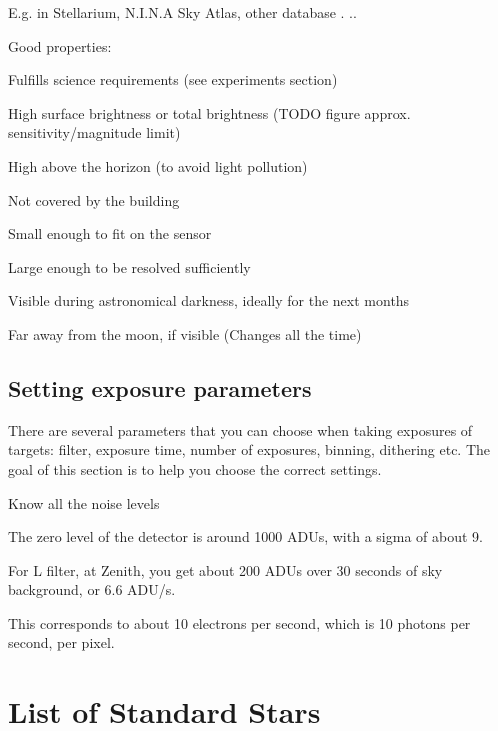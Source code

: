 \documentclass[a4paper, 11pt, fleqn]{memoir}
\begin{document}
E.g. in Stellarium, N.I.N.A Sky Atlas, other database .
..

Good properties:

Fulfills science requirements (see experiments section)

High surface brightness or total brightness (TODO figure approx.
sensitivity/magnitude limit)

High above the horizon (to avoid light pollution)

Not covered by the building

Small enough to fit on the sensor

Large enough to be resolved sufficiently

Visible during astronomical darkness, ideally for the next months

Far away from the moon, if visible (Changes all the time)

\section{Setting exposure parameters}

There are several parameters that you can choose when taking exposures of targets: filter, exposure time, number of exposures, binning, dithering etc. The goal of this section is to help you choose the correct settings.

Know all the noise levels

The zero level of the detector is around 1000 ADUs, with a sigma of about 9.

For L filter, at Zenith, you get about 200 ADUs over 30 seconds of sky background, or 6.6 ADU/s.

This corresponds to about 10 electrons per second, which is 10 photons per second, per pixel.

\backmatter

\appendix {}

\chapter{List of Standard Stars}
\end{document}
